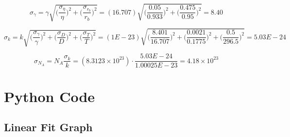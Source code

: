 \documentclass[12pt, letterpaper, twoside]{article}
\begin{document}
\begin{equation}
    \sigma_{\gamma} = \gamma\sqrt{\big(\frac{\sigma_{\eta}}{\eta}\big)^2 + \big(\frac{\sigma_{r_b}}{r_b}\big)^2} = (16.707)\sqrt{\big(\frac{0.05}{0.933}\big)^2 + \big(\frac{0.475}{0.95}\big)^2} = 8.40 
\end{equation}

\begin{equation}
        \sigma_{k} = k\sqrt{\big(\frac{\sigma_{\gamma}}{\gamma}\big)^2 + \big(\frac{\sigma_{D}}{D}\big)^2 + \big(\frac{\sigma_{T}}{T}\big)^2} = (1E-23)\sqrt{\big(\frac{8.401}{16.707}\big)^2 + \big(\frac{0.0021}{0.1775}\big)^2 + \big(\frac{0.5}{296.5}\big)^2} = 5.03E-24
\end{equation}

\begin{equation}
    \sigma_{N_A} = N_A\frac{\sigma_k}{k} = (8.3123\times10^{23})\cdot\frac{5.03E-24}{1.00025E-23} = 4.18 \times 10^{23}
\end{equation}

\section{Python Code}

\subsection{Linear Fit Graph}
\end{document}

